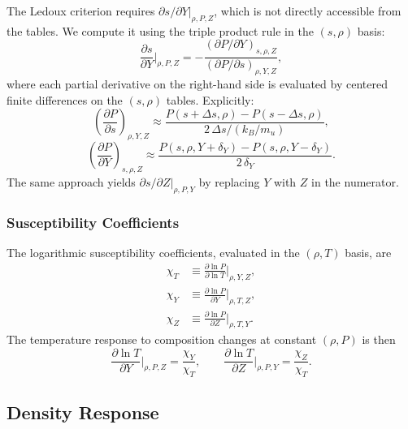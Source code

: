 \documentclass[twocolumn]{aastex701}
\begin{document}
The Ledoux criterion requires $\partial s/\partial Y|_{\rho,P,Z}$, which is not directly accessible from the tables.
We compute it using the triple product rule in the $(s,\rho)$ basis:
\begin{equation}\label{eq:triple}
    \frac{\partial s}{\partial Y}\bigg|_{\rho,P,Z} = -\frac{(\partial P/\partial Y)_{s,\rho,Z}}{(\partial P/\partial s)_{\rho,Y,Z}},
\end{equation}
where each partial derivative on the right-hand side is evaluated by centered finite differences on the $(s,\rho)$ tables.
Explicitly:
\begin{equation}
    \left(\frac{\partial P}{\partial s}\right)_{\!\rho,Y,Z} \approx \frac{P(s+\Delta s, \rho) - P(s-\Delta s, \rho)}{2\,\Delta s / (k_B/m_u)},
\end{equation}
\begin{equation}
    \left(\frac{\partial P}{\partial Y}\right)_{\!s,\rho,Z} \approx \frac{P(s, \rho, Y+\delta_Y) - P(s, \rho, Y-\delta_Y)}{2\,\delta_Y}.
\end{equation}
The same approach yields $\partial s/\partial Z|_{\rho,P,Y}$ by replacing $Y$ with $Z$ in the numerator.

\subsubsection{Susceptibility Coefficients}

The logarithmic susceptibility coefficients, evaluated in the $(\rho, T)$ basis, are
\begin{align}
    \chi_T &\equiv \frac{\partial \ln P}{\partial \ln T}\bigg|_{\rho,Y,Z}, \\
    \chi_Y &\equiv \frac{\partial \ln P}{\partial Y}\bigg|_{\rho,T,Z}, \\
    \chi_Z &\equiv \frac{\partial \ln P}{\partial Z}\bigg|_{\rho,T,Y}.
\end{align}
The temperature response to composition changes at constant $(\rho,P)$ is then
\begin{equation}
    \frac{\partial \ln T}{\partial Y}\bigg|_{\rho,P,Z} = \frac{\chi_Y}{\chi_T}, \qquad
    \frac{\partial \ln T}{\partial Z}\bigg|_{\rho,P,Y} = \frac{\chi_Z}{\chi_T}.
\end{equation}

\subsection{Density Response}
\end{document}
